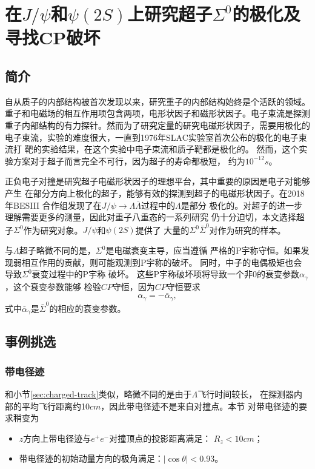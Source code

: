 ﻿%
%
%
\chapter{在$J/\psi$和$\psi(2S)$上研究超子$\Sigma^{0}$的极化及寻找CP破坏}%
\label{cha:polarization}
\section{简介}%
\label{sec:Sigma0-introduction}
自从质子的内部结构被首次发现以来，研究重子的内部结构始终是个活跃的领域。
重子和电磁场的相互作用项包含两项，电形状因子和磁形状因子。电子束流是探测
重子内部结构的有力探针。然而为了研究定量的研究电磁形状因子，需要用极化的
电子束流，实验的难度很大，一直到1976年SLAC实验室首次公布的极化的电子束流打
靶的实验结果\cite{Alguard:1976bk}，在这个实验中电子束流和质子靶都是极化的。
然而，这个实验方案对于超子而言完全不可行，因为超子的寿命都极短，
约为$10^{-12}s$。

正负电子对撞是研究超子电磁形状因子的理想平台，其中重要的原因是电子对能够产生
在部分方向上极化的超子，能够有效的探测到超子的电磁形状因子。在2018年BESIII
合作组发现了在$J/\psi \to \Lambda \bar{\Lambda}$过程中的$\Lambda$是部分
极化的。对超子的进一步理解需要更多的测量，因此对重子八重态的一系列研究
仍十分迫切，本文选择超子$\Sigma^{0}$作为研究对象。$J/\psi$和$\psi(2S)$提供了
大量的$\Sigma^{0}\bar{\Sigma}^{0}$对作为研究的样本。

与$\Lambda$超子略微不同的是，$\Sigma^{0}$是电磁衰变主导，应当遵循
严格的P宇称守恒。如果发现弱相互作用的贡献，则可能观测到P宇称的破坏。
同时，中子的电偶极矩也会导致$\Sigma^{0}$衰变过程中的P宇称
破坏\cite{NAIR2019535}。
这些P宇称破坏项将导致一个非0的衰变参数$\alpha_{\gamma}$，这个衰变参数能够
检验$CP$守恒，因为$CP$守恒要求
\begin{equation}
    \alpha_{\gamma} = - \bar{\alpha}_{\gamma},
\end{equation}
式中$\bar{\alpha}_{\gamma}$是$\bar{\Sigma}^{0}$的相应的衰变参数。

\section{事例挑选}%
\label{sec:sigma-event-selection}
\subsection{带电径迹}%
\label{sec:sigma-good-track}
和小节\ref{sec:charged-track}类似，略微不同的是由于$\Lambda$飞行时间较长，
在探测器内部的平均飞行距离约10$cm$，因此带电径迹不是来自对撞点。本节
对带电径迹的要求稍变为
\begin{itemize}
    \item $z$方向上带电径迹与$e^{+}e^{-}$对撞顶点的投影距离满足：
        $R_{z} < 10 cm$；
    \item 带电径迹的初始动量方向的极角满足：$|\cos\theta| < 0.93$。
\end{itemize}

